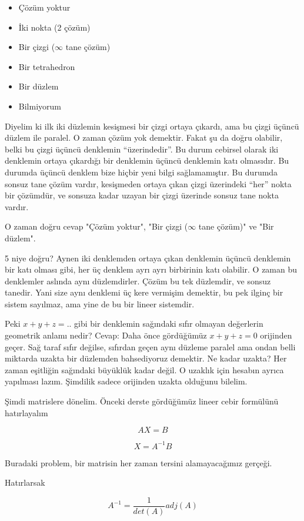 \documentclass[12pt,fleqn]{article}\usepackage{../../common}
\begin{document}
\begin{itemize} 
\item Çözüm yoktur
\item İki nokta (2 çözüm)
\item Bir çizgi ($\infty$ tane çözüm)
\item Bir tetrahedron
\item Bir düzlem
\item Bilmiyorum
\end{itemize}

Diyelim ki ilk iki düzlemin kesişmesi bir çizgi ortaya çıkardı, ama bu çizgi
üçüncü düzlem ile paralel. O zaman çözüm yok demektir. Fakat şu da doğru
olabilir, belki bu çizgi üçüncü denklemin ``üzerindedir''. Bu durum cebirsel
olarak iki denklemin ortaya çıkardığı bir denklemin üçüncü denklemin katı
olmasıdır. Bu durumda üçüncü denklem bize hiçbir yeni bilgi sağlamamıştır. Bu
durumda sonsuz tane çözüm vardır, kesişmeden ortaya çıkan çizgi üzerindeki
``her'' nokta bir çözümdür, ve sonsuza kadar uzayan bir çizgi üzerinde sonsuz
tane nokta vardır.

O zaman doğru cevap "Çözüm yoktur", "Bir çizgi ($\infty$ tane çözüm)" ve "Bir 
düzlem".

5 niye doğru? Aynen iki denklemden ortaya çıkan denklemin üçüncü denklemin bir
katı olması gibi, her üç denklem ayrı ayrı birbirinin katı olabilir. O zaman bu
denklemler aslında aynı düzlemdirler. Çözüm bu tek düzlemdir, ve sonsuz
tanedir. Yani size aynı denklemi üç kere vermişim demektir, bu pek ilginç bir
sistem sayılmaz, ama yine de bu bir lineer sistemdir.


Peki $x + y + z = ..$ gibi bir denklemin sağındaki sıfır olmayan değerlerin
geometrik anlamı nedir? Cevap: Daha önce gördüğümüz $x + y + z = 0$ orijinden
geçer. Sağ taraf sıfır değilse, sıfırdan geçen aynı düzleme paralel ama ondan
belli miktarda uzakta bir düzlemden bahsediyoruz demektir. Ne kadar uzakta? Her
zaman eşitliğin sağındaki büyüklük kadar değil. O uzaklık için hesabın ayrıca
yapılması lazım. Şimdilik sadece orijinden uzakta olduğunu bilelim.

Şimdi matrislere dönelim. Önceki derste gördüğümüz lineer cebir formülünü
hatırlayalım

$$ AX = B $$

$$ X = A^{-1}B $$

Buradaki problem, bir matrisin her zaman tersini alamayacağımız gerçeği. 

Hatırlarsak 

$$ A^{-1} = \frac{1}{det(A)}adj(A) $$
\end{document}
